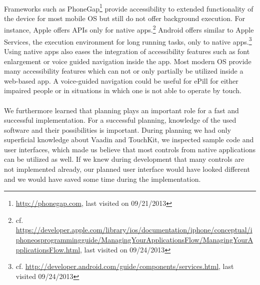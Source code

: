 \\
Frameworks such as PhoneGap\footnote{\url{http://phonegap.com}, last visited on 09/21/2013} provide accessibility to extended functionality of the device for most mobile OS but still do not offer background execution. For instance, Apple offers APIs only for native apps.\footnote{cf. \url{https://developer.apple.com/library/ios/documentation/iphone/conceptual/iphoneosprogrammingguide/ManagingYourApplicationsFlow/ManagingYourApplicationsFlow.html}, last visited on 09/24/2013} Android offers similar to Apple Services, the execution environment for long running tasks, only to native apps.\footnote{cf. \url{http://developer.android.com/guide/components/services.html}, last visited 09/24/2013}
\\
Using native apps also eases the integration of accessibility features such as font enlargement or voice guided navigation inside the app. Most modern OS provide many accessibility features which can not or only partially be utilized inside a web-based app. A voice-guided navigation could be useful for ePill for either impaired people or in situations in which one is not able to operate by touch.
\\
\\
We furthermore learned that planning plays an important role for a fast and successful implementation. For a successful planning, knowledge of the used software and their possibilities is important. During planning we had only superficial knowledge about Vaadin and TouchKit, we inspected sample code and user interfaces, which made us believe that most controls from native applications can be utilized as well. If we knew during development that many controls are not implemented already, our planned user interface would have looked different and we would have saved some time during the implementation.